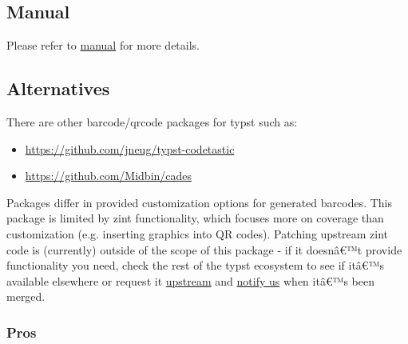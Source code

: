 \begin{Shaded}
\begin{Highlighting}[]


\end{Highlighting}
\end{Shaded}

\pandocbounded{}

\subsection{Manual}\label{manual}

Please refer to
\href{https://github.com/typst/packages/raw/main/packages/preview/tiaoma/0.2.1/manual.pdf}{manual}
for more details.

\subsection{Alternatives}\label{alternatives}

There are other barcode/qrcode packages for typst such as:

\begin{itemize}
\tightlist
\item
  \url{https://github.com/jneug/typst-codetastic}
\item
  \url{https://github.com/Midbin/cades}
\end{itemize}

Packages differ in provided customization options for generated
barcodes. This package is limited by zint functionality, which focuses
more on coverage than customization (e.g. inserting graphics into QR
codes). Patching upstream zint code is (currently) outside of the scope
of this package - if it doesnâ€™t provide functionality you need, check
the rest of the typst ecosystem to see if itâ€™s available elsewhere or
request it \href{https://github.com/zint/zint}{upstream} and
\href{https://github.com/Enter-tainer/zint-wasi/issues}{notify us} when
itâ€™s been merged.

\subsubsection{Pros}\label{pros}

